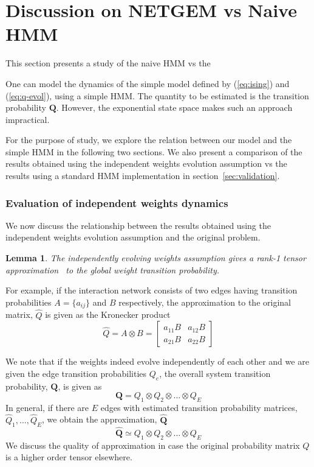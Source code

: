 \documentclass[11pt]{article}
\newtheorem{lemma}[theorem]{Lemma}
\begin{document}
\section{Discussion on NETGEM vs Naive HMM}
\label{sec:discussion}
This section presents a study of the naive HMM vs the 

One can model the dynamics of the simple
model defined by (\ref{eq:ising}) and (\ref{eq:q-evol}), using a
simple HMM. The quantity to be estimated is the transition probability
$\mathbf Q$. However, the exponential state space makes such an
approach impractical. 

For the purpose of study, we explore the relation between our model
and the simple HMM in the following two sections. We also present a comparison of
the results obtained using the independent weights evolution
assumption vs the results using a standard HMM implementation in  section~\ref{sec:validation}.

\subsubsection{Evaluation of independent weights dynamics} 
\label{sec:validity-assumption}
We now discuss the
relationship between the results obtained using the independent
weights evolution assumption and the original problem.  
\begin{lemma}
The independently evolving weights assumption gives a rank-1 tensor approximation~\cite{Horn90}  to the global weight
transition probability.  
\end{lemma}
For example, if the interaction network consists of two edges having transition
probabilities $A = \{a_{ij}\}$
and $B$ respectively, the approximation to
the original matrix, $\hat{Q}$ is given as the Kronecker product
\[ \hat{Q} = A \otimes B = \left[
  \begin{array}{cc}
    a_{11} B & a_{12} B \\
    a_{21} B & a_{22} B
  \end{array}
\right]
\]

We note that if the weights indeed evolve independently of each other
and we are given the edge transition probabilities
$Q_{e}$, the overall system transition probability, $\mathbf{Q}$, is
given as 
\[
\mathbf{Q} = Q_{1} \otimes Q_{2} \otimes \ldots \otimes Q_{E}
\]
In general, if there are $E$ edges with estimated transition
probability matrices, $\hat{Q}_{1}, \ldots, \hat{Q}_{E}$, we obtain the approximation, $\hat{\mathbf{Q}}$
\[
\hat{\mathbf{Q}} \simeq Q_{1} \otimes Q_{2} \otimes \ldots \otimes Q_{E}
\]
We discuss the quality of approximation in case the original
probability matrix $Q$ is a higher order tensor
elsewhere. 
\end{document}
